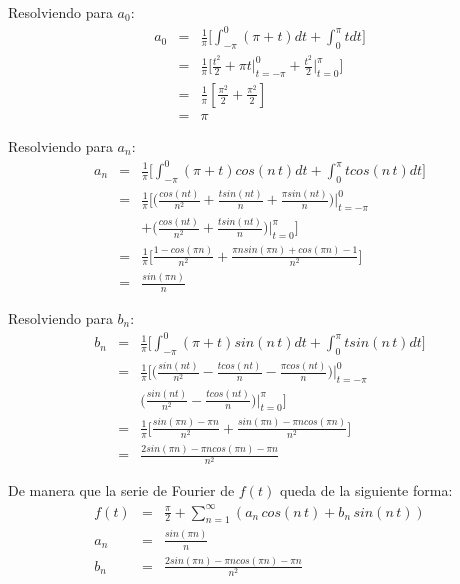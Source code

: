 \documentclass[twocolumn]{article}
\begin{document}
Resolviendo para $a_0$:
\begin{eqnarray*}
a_0 &=& \frac{1}{\pi} \bigg[ \int_{-\pi}^{0}(\pi + t) dt + \int_{0}^{\pi}t dt \bigg]\\
&=& \frac{1}{\pi} \bigg[ \frac{t^{2}}{2} + \pi t\bigg|_{t=-\pi}^{0} + \frac{t^{2}}{2}\bigg|_{t=0}^{\pi} \bigg] \\
&=& \frac{1}{\pi} [\frac{\pi^{2}}{2} + \frac{\pi^{2}}{2}]\\
&=& \pi
\end{eqnarray*}

Resolviendo para $a_n$:
\begin{eqnarray*}
a_n &=& \frac{1}{\pi} \bigg[ \int_{-\pi}^{0}(\pi + t)cos(n\,t) dt + \int_{0}^{\pi}tcos(n\,t) dt \bigg] \\
&=& \frac{1}{\pi} \bigg[ \bigg(\frac{cos(n t)}{n^{2}} + \frac{t sin(n t)}{n} + \frac{\pi sin(n t)}{n}\bigg)\bigg|_{t=-\pi}^{0}\\
& & + \bigg(\frac{cos(nt)}{n^{2}} + \frac{tsin(n t)}{n}\bigg)\bigg|_{t=0}^{\pi} \bigg] \\
&=& \frac{1}{\pi} \bigg[ \frac{1 - cos(\pi n)}{n^{2}}+ \frac{\pi n sin(\pi n)+ cos(\pi n) -1}{n^{2}} \bigg]\\
&=& \frac{sin(\pi n)}{n}
\end{eqnarray*}

Resolviendo para $b_n$:
\begin{eqnarray*}
b_n &=&  \frac{1}{\pi} \bigg[ \int_{-\pi}^{0}(\pi + t)sin(n\,t) dt + \int_{0}^{\pi}tsin(n\,t) dt \bigg] \\
&=&  \frac{1}{\pi} \bigg[ \bigg(\frac{sin(n t)}{n^{2}} - \frac{tcos(n t)}{n} - \frac{\pi cos(n t)}{n}\bigg)\bigg|_{t=-\pi}^{0}\\
& & \bigg(\frac{sin(n t)}{n^{2}} - \frac{tcos(n t)}{n}\bigg)\bigg|_{t=0}^{\pi} \bigg] \\
&=& \frac{1}{\pi} \bigg[ \frac{sin(\pi n)-\pi n}{n^{2}} + \frac{sin(\pi n)-\pi n cos(\pi n)}{n^{2}} \bigg]\\
&=& \frac{2sin(\pi n)-\pi n cos(\pi n) - \pi n}{n^{2}}
\end{eqnarray*}

De manera que la serie de Fourier de $f(t)$ queda de la siguiente forma:
\begin{eqnarray*}
f(t) &=& \frac{\pi}{2} + \sum_{n=1}^\infty\left(a_n\,cos(n\,t)+ b_n\,sin(n\,t)\right)\\
a_n &=&  \frac{sin(\pi n)}{n} \\
b_n &=&   \frac{2sin(\pi n)-\pi n cos(\pi n) - \pi n}{n^{2}}
\end{eqnarray*}
\end{document}
